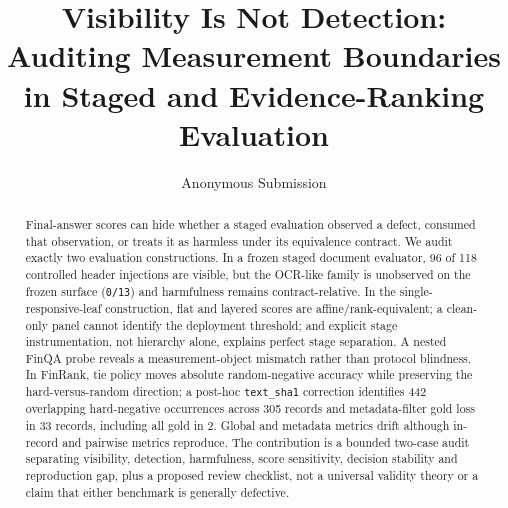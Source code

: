 \documentclass[10pt,conference]{IEEEtran}
\begin{document}
\title{Visibility Is Not Detection: Auditing Measurement Boundaries in Staged and Evidence-Ranking Evaluation}
\author{Anonymous Submission}
\maketitle
\begin{abstract}
Final-answer scores can hide whether a staged evaluation observed a defect, consumed that observation, or treats it as harmless under its equivalence contract. We audit exactly two evaluation constructions. In a frozen staged document evaluator, 96 of 118 controlled header injections are visible, but the OCR-like family is unobserved on the frozen surface (\texttt{0/13}) and harmfulness remains contract-relative. In the single-responsive-leaf construction, flat and layered scores are affine/rank-equivalent; a clean-only panel cannot identify the deployment threshold; and explicit stage instrumentation, not hierarchy alone, explains perfect stage separation. A nested FinQA probe reveals a measurement-object mismatch rather than protocol blindness. In FinRank, tie policy moves absolute random-negative accuracy while preserving the hard-versus-random direction; a post-hoc \texttt{text\_sha1} correction identifies 442 overlapping hard-negative occurrences across 305 records and metadata-filter gold loss in 33 records, including all gold in 2. Global and metadata metrics drift although in-record and pairwise metrics reproduce. The contribution is a bounded two-case audit separating visibility, detection, harmfulness, score sensitivity, decision stability and reproduction gap, plus a proposed review checklist, not a universal validity theory or a claim that either benchmark is generally defective.
\end{abstract}
\end{document}
